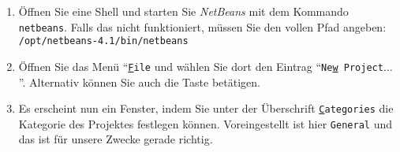 \documentclass{article}
\begin{document}
\begin{enumerate}
\item Öffnen Sie eine  Shell und starten Sie \textsl{NetBeans} mit dem Kommando
      \texttt{netbeans}.  Falls das nicht funktioniert, m\"ussen Sie den vollen Pfad
      angeben: \\[0.1cm]
      \hspace*{1.3cm} \texttt{/opt/netbeans-4.1/bin/netbeans}
\item Öffnen Sie das Men\"u ``\texttt{\underline{F}ile} und w\"ahlen Sie dort den Eintrag
      ``\texttt{Ne\underline{w} Project}$\dots$''.
      Alternativ k\"onnen Sie auch die Taste  bet\"atigen.
\item Es erscheint nun ein Fenster, indem Sie unter der Überschrift
      \texttt{\underline{C}ategories}  die Kategorie des Projektes festlegen k\"onnen.
      Voreingestellt ist hier \texttt{General} und das ist f\"ur unsere Zwecke gerade richtig.


\end{enumerate}
\end{document}
